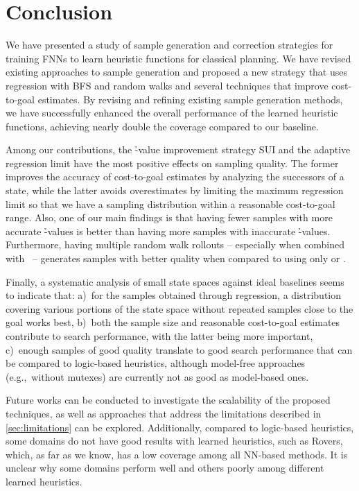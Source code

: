 \chapter{Conclusion}
\label{sec:conclusion}

We have presented a study of sample generation and correction strategies for training FNNs to learn heuristic functions for classical planning. We have revised existing approaches to sample generation and proposed a new strategy that uses regression with BFS and random walks and several techniques that improve cost-to-goal estimates. By revising and refining existing sample generation methods, we have successfully enhanced the overall performance of the learned heuristic functions, achieving nearly double the coverage compared to our baseline.

Among our contributions, the \h-value improvement strategy SUI and the adaptive regression limit \rlmeanfx have the most positive effects on sampling quality. The former improves the accuracy of cost-to-goal estimates by analyzing the successors of a state, while the latter avoids overestimates by limiting the maximum regression limit so that we have a sampling distribution within a reasonable cost-to-goal range. Also, one of our main findings is that having fewer samples with more accurate \h-values is better than having more samples with inaccurate \h-values. Furthermore, having multiple random walk rollouts -- especially when combined with \bfs~-- generates samples with better quality when compared to using only \bfs or \dfs.

Finally, a systematic analysis of small state spaces against ideal baselines seems to indicate that: a)~for the samples obtained through regression, a distribution covering various portions of the state space without repeated samples close to the goal works best, b)~both the sample size and reasonable cost-to-goal estimates contribute to search performance, with the latter being more important, c)~enough samples of good quality translate to good search performance that can be compared to logic-based heuristics, although model-free approaches (e.g.,~without mutexes) are currently not as good as model-based ones.

Future works can be conducted to investigate the scalability of the proposed techniques, as well as approaches that address the limitations described in \cref{sec:limitations} can be explored. Additionally, compared to logic-based heuristics, some domains do not have good results with learned heuristics, such as Rovers, which, as far as we know, has a low coverage among all NN-based methods. It is unclear why some domains perform well and others poorly among different learned heuristics.

